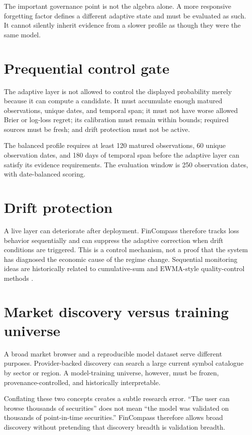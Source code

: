 \documentclass[11pt]{article}
\begin{document}
The important governance point is not the algebra alone. A more responsive forgetting factor defines a different adaptive state and must be evaluated as such. It cannot silently inherit evidence from a slower profile as though they were the same model.

\section{Prequential control gate}

The adaptive layer is not allowed to control the displayed probability merely because it can compute a candidate. It must accumulate enough matured observations, unique dates, and temporal span; it must not have worse allowed Brier or log-loss regret; its calibration must remain within bounds; required sources must be fresh; and drift protection must not be active.

The balanced profile requires at least 120 matured observations, 60 unique observation dates, and 180 days of temporal span before the adaptive layer can satisfy its evidence requirements. The evaluation window is 250 observation dates, with date-balanced scoring.

\section{Drift protection}

A live layer can deteriorate after deployment. FinCompass therefore tracks loss behavior sequentially and can suppress the adaptive correction when drift conditions are triggered. This is a control mechanism, not a proof that the system has diagnosed the economic cause of the regime change. Sequential monitoring ideas are historically related to cumulative-sum and EWMA-style quality-control methods \citep{page1954continuous,roberts1959control}.

\section{Market discovery versus training universe}

A broad market browser and a reproducible model dataset serve different purposes. Provider-backed discovery can search a large current symbol catalogue by sector or region. A model-training universe, however, must be frozen, provenance-controlled, and historically interpretable.

Conflating these two concepts creates a subtle research error. ``The user can browse thousands of securities'' does not mean ``the model was validated on thousands of point-in-time securities.'' FinCompass therefore allows broad discovery without pretending that discovery breadth is validation breadth.
\end{document}
